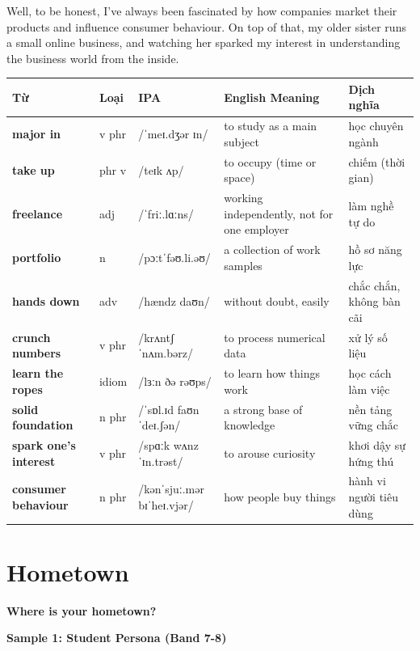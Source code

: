 Well, to be honest, I've always been fascinated by how companies market their products and influence consumer behaviour. On top of that, my older sister runs a small online business, and watching her sparked my interest in understanding the business world from the inside.

\separator


\vspace{0.8em}
\begin{center}
\renewcommand{\arraystretch}{1.65}
\begin{tabularx}{\textwidth}{|V{0.22\textwidth}|C{0.07\textwidth}|I{0.20\textwidth}|Y|V{0.18\textwidth}|}
\hline
{}
\textbf{Từ} & \textbf{Loại} & \textbf{IPA} & \textbf{English Meaning} & \textbf{Dịch nghĩa} \\
\hline
\textbf{major in} & v phr & /ˈmeɪ.dʒər ɪn/ & to study as a main subject & học chuyên ngành \\ \hline
\textbf{take up} & phr v & /teɪk ʌp/ & to occupy (time or space) & chiếm (thời gian) \\ \hline
\textbf{freelance} & adj & /ˈfriː.lɑːns/ & working independently, not for one employer & làm nghề tự do \\ \hline
\textbf{portfolio} & n & /pɔːtˈfəʊ.li.əʊ/ & a collection of work samples & hồ sơ năng lực \\ \hline
\textbf{hands down} & adv & /hændz daʊn/ & without doubt, easily & chắc chắn, không bàn cãi \\ \hline
\textbf{crunch numbers} & v phr & /krʌntʃ ˈnʌm.bərz/ & to process numerical data & xử lý số liệu \\ \hline
\textbf{learn the ropes} & idiom & /lɜːn ðə rəʊps/ & to learn how things work & học cách làm việc \\ \hline
\textbf{solid foundation} & n phr & /ˈsɒl.ɪd faʊnˈdeɪ.ʃən/ & a strong base of knowledge & nền tảng vững chắc \\ \hline
\textbf{spark one's interest} & v phr & /spɑːk wʌnz ˈɪn.trəst/ & to arouse curiosity & khơi dậy sự hứng thú \\ \hline
\textbf{consumer behaviour} & n phr & /kənˈsjuː.mər bɪˈheɪ.vjər/ & how people buy things & hành vi người tiêu dùng \\ \hline
\end{tabularx}
\end{center}

\newpage

\section{Hometown}
\begin{ieltsquestion}
\textbf{Where is your hometown?}
\end{ieltsquestion}
\textbf{Sample 1: Student Persona (Band 7-8)}

